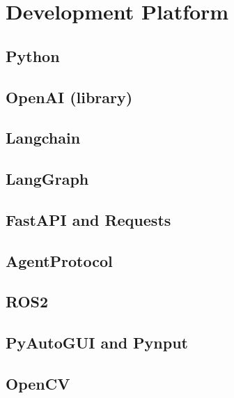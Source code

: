 \chapter{Development Platform}

\section{Python}

\section{OpenAI (library)}

\section{Langchain}

\section{LangGraph}

\section{FastAPI and Requests}

\section{AgentProtocol}

\section{ROS2}

\section{PyAutoGUI and Pynput}

\section{OpenCV}